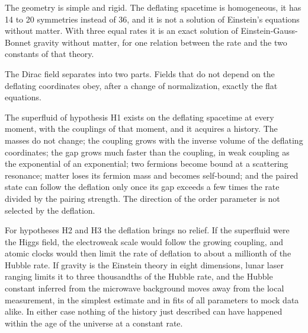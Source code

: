 The geometry is simple and rigid. The deflating spacetime is homogeneous, it has 14 to 20 symmetries
instead of 36, and it is not a solution of Einstein's equations without matter. With three equal
rates it is an exact solution of Einstein-Gauss-Bonnet gravity without matter, for one relation
between the rate and the two constants of that theory.

The Dirac field separates into two parts. Fields that do not depend on the deflating coordinates
obey, after a change of normalization, exactly the flat equations.

The superfluid of hypothesis H1 exists on the deflating spacetime at every moment, with the
couplings of that moment, and it acquires a history. The masses do not change; the coupling grows
with the inverse volume of the deflating coordinates; the gap grows much faster than the coupling,
in weak coupling as the exponential of an exponential; two fermions become bound at a scattering
resonance; matter loses its fermion mass and
becomes self-bound; and the paired state can follow the deflation only once its gap exceeds a few
times the rate divided by the pairing strength. The direction of the order parameter is not selected
by the deflation.

For hypotheses H2 and H3 the deflation brings no relief. 
If the superfluid were the Higgs field, the electroweak scale would follow the growing coupling, and
atomic clocks would then limit the rate of deflation to about a millionth of the Hubble rate. If
gravity is the Einstein theory in eight dimensions, lunar laser ranging limits it to three
thousandths of the Hubble rate, and the Hubble constant inferred from the microwave background
moves away from the local measurement, in the simplest estimate and in fits of all parameters to
mock data alike. In either case nothing of the history just described can have happened within the
age of the universe at a constant rate.

